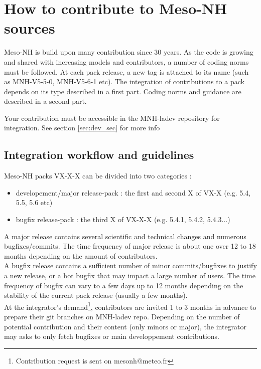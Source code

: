 \section{How to contribute to Meso-NH sources}
\label{sec:contribute}
Meso-NH is build upon many contribution since 30 years. As the code is growing and shared with increasing models and contributors, a number of coding norms must be followed. At each pack release, a new tag is attached to its name (such as MNH-V5-5-0, MNH-V5-6-1 etc). The integration of contributions to a pack depends on its type described in a first part. Coding norms and guidance are described in a second part.
\begin{importantblock}
Your contribution must be accessible in the MNH-ladev repository for integration.
See section \ref{sec:dev_sec} for more info
\end{importantblock}
\subsection{Integration workflow and guidelines}
Meso-NH packs VX-X-X can be divided into two categories :
\begin{itemize}
    \item developement/major release-pack : the first and second X of VX-X (e.g. 5.4, 5.5, 5.6 etc)
    \item bugfix release-pack : the third X of VX-X-X (e.g. 5.4.1, 5.4.2, 5.4.3...)
\end{itemize}
A major release contains several scientific and technical changes and numerous bugfixes/commits. The time frequency of major release is about one over 12 to 18 months depending on the amount of contributors. \\
A bugfix release contains a sufficient number of minor commits/bugfixes to justify a new release, or a hot bugfix that may impact a large number of users. The time frequency of bugfix can vary to a few days up to 12 months depending on the stability of the current pack release (usually a few months). \\

At the integrator's demand\footnote{Contribution request is sent on mesonh@meteo.fr}, contributors are invited 1 to 3 months in advance to prepare their git branches on MNH-ladev repo. Depending on the number of potential contribution and their content (only minors or major), the integrator may asks to only fetch bugfixes or main developpement contributions. \\

